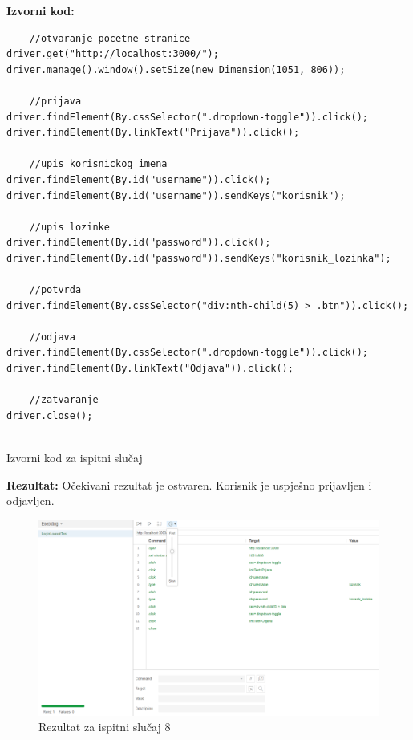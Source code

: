 			\noindent \textbf{Izvorni kod:}

\begin{verbatim}
    //otvaranje pocetne stranice
driver.get("http://localhost:3000/");
driver.manage().window().setSize(new Dimension(1051, 806));

    //prijava
driver.findElement(By.cssSelector(".dropdown-toggle")).click();
driver.findElement(By.linkText("Prijava")).click();
    
    //upis korisnickog imena
driver.findElement(By.id("username")).click();
driver.findElement(By.id("username")).sendKeys("korisnik");
    
    //upis lozinke
driver.findElement(By.id("password")).click();
driver.findElement(By.id("password")).sendKeys("korisnik_lozinka");
    
    //potvrda
driver.findElement(By.cssSelector("div:nth-child(5) > .btn")).click();

    //odjava
driver.findElement(By.cssSelector(".dropdown-toggle")).click();
driver.findElement(By.linkText("Odjava")).click();

    //zatvaranje
driver.close();
 
\end{verbatim}
			\begin{listing}[H]
				\caption{Izvorni kod za ispitni slučaj \thetestcase}
				\label{test3}
			\end{listing}
			\noindent \textbf{Rezultat:} Očekivani rezultat je ostvaren. Korisnik je uspješno prijavljen i odjavljen.
				\begin{figure}[H]
            					\includegraphics[width=\linewidth]{slike/selenium/LoginLogout.png}
            					\centering
            					\caption{Rezultat za ispitni slučaj 8}
            					\label{fig:test 8}
            		            \end{figure}
			\clearpage
		


